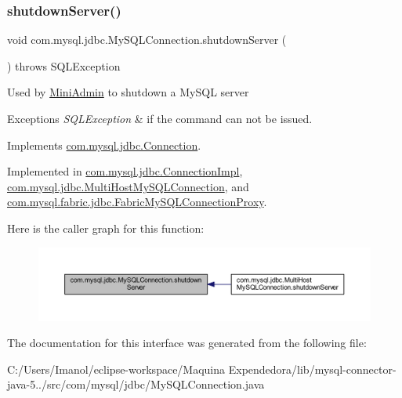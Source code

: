 \subsubsection{\texorpdfstring{shutdown\+Server()}{shutdownServer()}}
{\footnotesize\ttfamily void com.\+mysql.\+jdbc.\+My\+S\+Q\+L\+Connection.\+shutdown\+Server (\begin{DoxyParamCaption}{ }\end{DoxyParamCaption}) throws S\+Q\+L\+Exception}

Used by \mbox{\hyperlink{classcom_1_1mysql_1_1jdbc_1_1_mini_admin}{Mini\+Admin}} to shutdown a My\+S\+QL server


\begin{DoxyExceptions}{Exceptions}
{\em S\+Q\+L\+Exception} & if the command can not be issued. \\
\hline
\end{DoxyExceptions}


Implements \mbox{\hyperlink{interfacecom_1_1mysql_1_1jdbc_1_1_connection_a58ca482a0546e93af285d0e9836d7fae}{com.\+mysql.\+jdbc.\+Connection}}.



Implemented in \mbox{\hyperlink{classcom_1_1mysql_1_1jdbc_1_1_connection_impl_a3c07294052ff8c623efdb0478dff6cde}{com.\+mysql.\+jdbc.\+Connection\+Impl}}, \mbox{\hyperlink{classcom_1_1mysql_1_1jdbc_1_1_multi_host_my_s_q_l_connection_a84e14d759493436465fa6bf6160e5153}{com.\+mysql.\+jdbc.\+Multi\+Host\+My\+S\+Q\+L\+Connection}}, and \mbox{\hyperlink{classcom_1_1mysql_1_1fabric_1_1jdbc_1_1_fabric_my_s_q_l_connection_proxy_ac227e92bb718704cd526d8bc728303c7}{com.\+mysql.\+fabric.\+jdbc.\+Fabric\+My\+S\+Q\+L\+Connection\+Proxy}}.

Here is the caller graph for this function\+:
\nopagebreak
\begin{figure}[H]
\begin{center}
\leavevmode
\includegraphics[width=350pt]{interfacecom_1_1mysql_1_1jdbc_1_1_my_s_q_l_connection_ab6fa367972e51a54bc186f7856568098_icgraph}
\end{center}
\end{figure}


The documentation for this interface was generated from the following file\+:\begin{DoxyCompactItemize}
\item 
C\+:/\+Users/\+Imanol/eclipse-\/workspace/\+Maquina Expendedora/lib/mysql-\/connector-\/java-\/5../src/com/mysql/jdbc/My\+S\+Q\+L\+Connection.\+java\end{DoxyCompactItemize}
